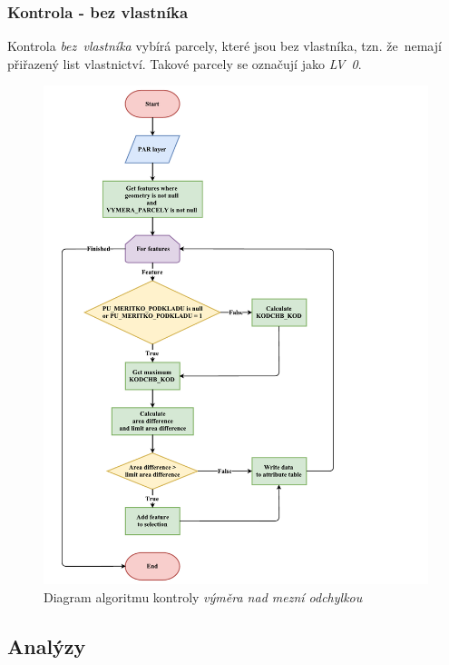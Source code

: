 \subsubsection{Kontrola - bez vlastníka}
\label{kontrola_bez_vlastnika}

Kontrola \textit{bez~vlastníka} vybírá parcely, které jsou bez vlastníka, tzn. že~nemají přiřazený list vlastnictví. Takové parcely se označují jako \textit{LV~0}.

	\begin{figure}[H]
		\centering
		\includegraphics[width=1.2\textwidth]{./pictures/vymera.pdf}
		\caption[Diagram algoritmu kontroly \textit{výměra nad mezní odchylkou}]{Diagram algoritmu kontroly \textit{výměra nad mezní odchylkou}}
		\label{fig:diagram_vymera}
 	\end{figure}

\subsection{Analýzy}
\label{analyzy}

